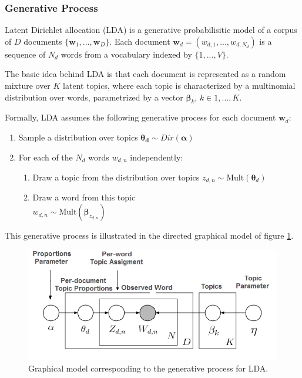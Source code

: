 \documentclass{article}
\begin{document}
\subsubsection{Generative Process}
Latent Dirichlet allocation (LDA) is a generative probabilisitic model of a corpus of $D$ documents $\{\mathbf{w}_1,..., \mathbf{w}_D\}$. Each document $\mathbf{w}_d = (w_{d,1},...,w_{d,N_d})$ is a sequence of $N_d$ words from a vocabulary indexed by $\{1,...,V\}$. 

The basic idea behind LDA is that each document is represented as a random mixture over $K$ latent topics, where each topic is characterized by a multinomial distribution over words, parametrized by a vector $\bm{\beta}_{k}$, $k \in {1,...,K}$. 

Formally, LDA assumes the following generative process for each document $\mathbf{w}_d$:
\begin{enumerate}
\item Sample a distribution over topics $\bm{\theta_d} \sim Dir(\bm{\alpha})$
\item For each of the $N_d$ words $w_{d,n}$ independently:
\begin{enumerate}
\item Draw a topic from the distribution over topics $z_{d,n} \sim \mathrm{Mult}(\bm{\theta}_d)$
\item Draw a word from this topic \\ 
$w_{d,n} \sim \mathrm{Mult}(\bm{\beta}_{z_{d,n}})$
\end{enumerate}
\end{enumerate}
This generative process is illustrated in the directed graphical model of figure \ref{graph_model}.

\begin{figure}[ht]
\vskip 0.2in
\begin{center}
\centerline{\includegraphics[width=\columnwidth]{LDA_graph_model}}
\caption{Graphical model corresponding to the generative process for LDA.}
\label{graph_model}
\end{center}
\vskip -0.2in
\end{figure} 
\end{document}
